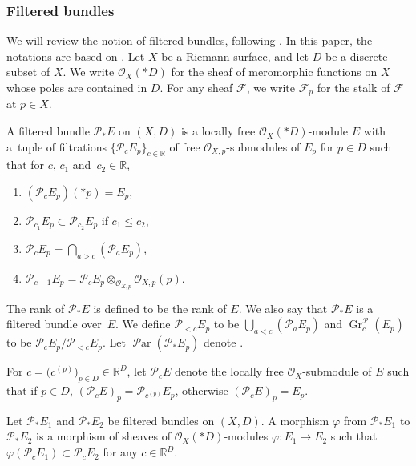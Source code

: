 \documentclass[pdftex]{sigma}
\numberwithin{equation}{section}
\newcommand{\R}{\mathbb{R}}
\newcommand{\strsheaf}{\mathcal{O}}
\newcommand{\gr}{\operatorname{\mathrm{Gr}}}
\newcommand{\pa}{\operatorname{\mathcal{P}ar}}
\begin{document}
\subsubsection{Filtered bundles}
We will review the notion of filtered bundles, following \cite{Mo1,Si1,Si2}. In this paper, the notations are based on \cite{LM1}.
Let $X$ be a Riemann surface, and let $D$ be a discrete subset of $X$. We write $\mathcal{O}_{X}(*D)$ for the sheaf of meromorphic functions on $X$ whose poles are contained in $D$. For any sheaf $\mathcal{F}$, we write $\mathcal{F}_p$ for the stalk of $\mathcal{F}$ at $p\in X$.
\begin{Definition}
 A filtered bundle $\mathcal{P}_* E$ on $(X,D)$ is a locally free $\mathcal{O}_{X}(*D)$-module $E$ with a~tuple of filtrations $\{\mathcal{P}_{c} E_p\}_{c\in \R}$ of free $\strsheaf_{X,p}$-submodules of $E_p$ for $p\in D$ such that for $c$, $c_1$ and~$c_2\in \R$,
 \begin{enumerate}\itemsep=0pt
 \item[1)] $(\mathcal{P}_{c} E_p)(*p) = E_p$,
 \item[2)] $\mathcal{P}_{c_1} E_p \subset \mathcal{P}_{c_2} E_p$ if $c_1 \leq c_2$,
 \item[3)] $\mathcal{P}_{c} E_p =\bigcap_{a>c} (\mathcal{P}_{a} E_p)$,
 \item[4)] $\mathcal{P}_{c+1} E_p = \mathcal{P}_{c} E_p \otimes_{\mathcal{O}_{X,p}} \mathcal{O}_{X,p}(p)$.
 \end{enumerate}
 The rank of $\mathcal{P}_* E$ is defined to be the rank of $E$. We also say that $\mathcal{P}_* E$ is a filtered bundle over~$E$.
 We define $\mathcal{P}_{<c} E_p$ to be $\bigcup_{a<c} (\mathcal{P}_a E_p)$ and $\gr^{\mathcal{P}}_{c} (E_p)$ to be $\mathcal{P}_{c} E_p /\mathcal{P}_{<c} E_p$. Let $\pa(\mathcal{P}_{*} E_p)$ denote \smash{$\bigl\{c\in\R \mid \gr^{\mathcal{P}}_{c} (E_p)\neq 0\bigr\}$}.
\end{Definition}
For $c=\bigl(c^{(p)}\bigr)_{p\in D} \in \R^{D}$, let $\mathcal{P}_{c} E$ denote the locally free $\strsheaf_{X}$-submodule of $E$ such that if $p\in D$, $(\mathcal{P}_{c} E)_{p} = \mathcal{P}_{c^{(p)}} E_p$, otherwise $(\mathcal{P}_{c} E)_{p} = E_p$.
\begin{Definition}
 Let $\mathcal{P}_* E_1$ and $\mathcal{P}_* E_2$ be filtered bundles on $(X,D)$. A morphism $\varphi$ from $\mathcal{P}_* E_1$ to $\mathcal{P}_* E_2$ is a morphism of sheaves of $\mathcal{O}_{X}(*D)$-modules $\varphi\colon E_1\to E_2$ such that $\varphi(\mathcal{P}_{c} E_{1}) \subset \mathcal{P}_{c} E_{2}$ for any $c\in \R^{D}$.
\end{Definition}
\end{document}
